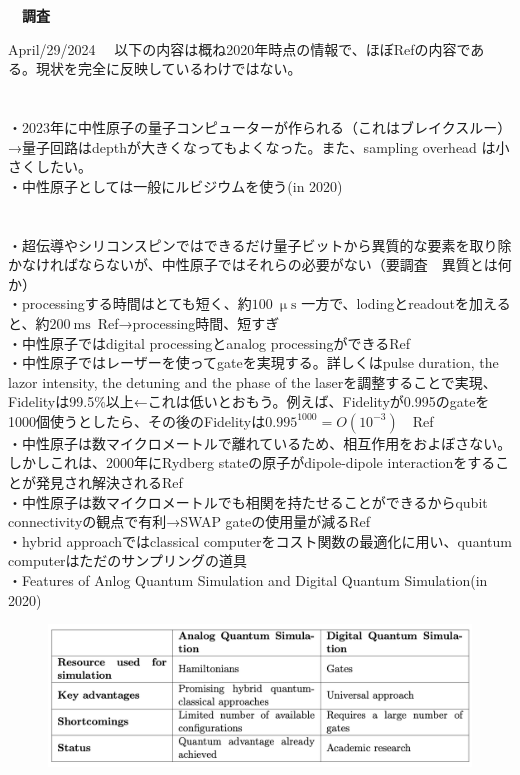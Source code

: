 \documentclass[a4paper,10.5pt]{ltjsarticle}
\begin{document}
\centerline
{\huge \bfseries　調査}
\rightline
{April/29/2024}
\leftline
{}
　以下の内容は概ね2020年時点の情報で、ほぼRef\cite{1}の内容である。現状を完全に反映しているわけではない。\\
\\
\\
・2023年に中性原子の量子コンピューターが作られる（これはブレイクスルー）→量子回路はdepthが大きくなってもよくなった。また、sampling overhead は小さくしたい。\\
・中性原子としては一般にルビジウムを使う(in 2020)\\
\\
\\
・超伝導やシリコンスピンではできるだけ量子ビットから異質的な要素を取り除かなければならないが、中性原子ではそれらの必要がない（要調査　異質とは何か）\\
・processingする時間はとても短く、約$100\ \mathrm{\upmu s}$ 一方で、lodingとreadoutを加えると、約$200\ \mathrm{ms}$\ Ref\cite{1}→processing時間、短すぎ\\
・中性原子ではdigital processingとanalog processingができるRef\cite{1}\\
・中性原子ではレーザーを使ってgateを実現する。詳しくはpulse duration, the lazor intensity, the detuning and the phase of the laserを調整することで実現、Fidelityは99.5\%以上←これは低いとおもう。例えば、Fidelityが0.995のgateを1000個使うとしたら、その後のFidelityは$0.995^{1000}=O(10^{-3})$　Ref\cite{1}\\
・中性原子は数マイクロメートルで離れているため、相互作用をおよぼさない。しかしこれは、2000年にRydberg stateの原子がdipole-dipole interactionをすることが発見され解決されるRef\cite{1}\\
・中性原子は数マイクロメートルでも相関を持たせることができるからqubit connectivityの観点で有利→SWAP gateの使用量が減るRef\cite{1}\\
・hybrid approachではclassical computerをコスト関数の最適化に用い、quantum computerはただのサンプリングの道具\\
・Features of Anlog Quantum Simulation and Digital Quantum Simulation(in 2020)
\begin{figure}[h]
  \centering
  \includegraphics[scale=0.5]{figure1.png}
\end{figure}\\
\end{document}
